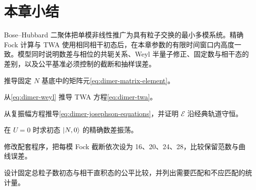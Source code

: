 \section*{本章小结}

Bose--Hubbard 二聚体把单模非线性推广为具有粒子交换的最小多模系统。精确 Fock 计算与 TWA 使用相同相干初态后，在本章参数的有限时间窗口内高度一致。模型同时说明数差与相位的共轭关系、Weyl 半量子修正、固定数与相干态的差别，以及公平基准必须控制的截断和抽样误差。

\begin{exercises}
  \item 推导固定 $N$ 基底中的矩阵元\cref{eq:dimer-matrix-element}。
  \item 从\cref{eq:dimer-weyl} 推导 TWA 方程\cref{eq:dimer-twa}。
  \item 从复振幅方程推导\cref{eq:dimer-josephson-equations}，并证明 $\mathcal E$ 沿经典轨道守恒。
  \item 在 $U=0$ 时求初态 $\left\lvert N,0\right\rangle$ 的精确数差振荡。
  \item 修改配套程序，把每模 Fock 截断依次设为 16、20、24、28，比较保留范数与曲线误差。
  \item 设计固定总粒子数初态与相干直积态的公平比较，并列出需要匹配和不应匹配的统计量。
\end{exercises}
